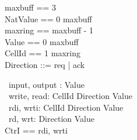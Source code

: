 \documentclass[10pt]{article}
\begin{document}
\begin{circus}
maxbuff == 3 \\
NatValue == 0 \upto maxbuff\\
maxring == maxbuff - 1 \\
Value == 0 \upto maxbuff \\
CellId == 1 \upto maxring \\
Direction ::=  req | ack
\end{circus}
\begin{circus}
\circchannel\ input, output : Value \\
\circchannel\ write, read: CellId \cross Direction \cross Value \\
\circchannel\ rdi, wrti: CellId \cross Direction \cross Value \\
\circchannel\ rd, wrt: Direction \cross Value \\
\circchannelset CtrI == \lchanset rdi, wrti \rchanset \\
\end{circus}
\end{document}
